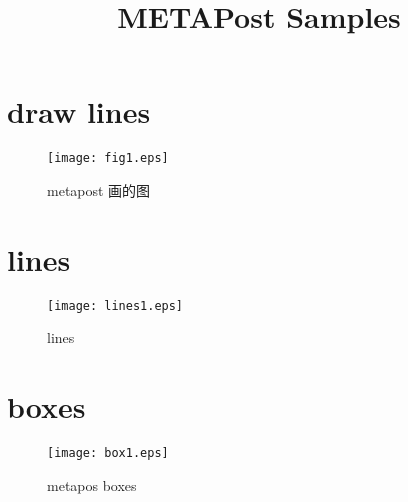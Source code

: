 \documentclass[a4paper,9pt,twoside,openany]{article}
\begin{document}
\title{METAPost Samples}
\section{draw lines}
\begin{figure}
\centering
\texttt{[image: fig1.eps]}
\caption{metapost 画的图}
\end{figure}

\section{lines}
\begin{figure}
\centering
\texttt{[image: lines1.eps]}
\caption{lines}
\end{figure}

\section{boxes}
\begin{figure}
\centering
\texttt{[image: box1.eps]}
\caption{metapos boxes}
\end{figure}
\end{document}
